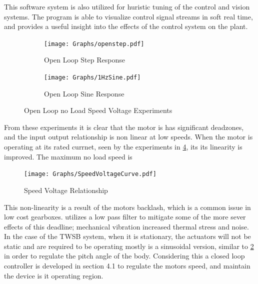         This software system is also utilized for huristic tuning of the control
        and vision systems. The program is able to visualize control signal streams in soft real time, 
        and provides a useful insight into the effects of the control system on the plant.

        \begin{figure}[H]
            \centering
            \begin{subfigure}[b]{0.45\textwidth}
            \texttt{[image: Graphs/openstep.pdf]}
            \caption{Open Loop Step Response}
            \label{fig:openstep}
            \end{subfigure}
            \hfill
            \begin{subfigure}[b]{0.45\textwidth}
            \texttt{[image: Graphs/1HzSine.pdf]}

            \caption{Open Loop Sine Response}
            \label{fig:opensine}
            \end{subfigure}
            \caption{Open Loop no Load Speed Voltage Experiments}
            \label{fig:openloop}
        \end{figure}


        From these experiments it is clear that the motor is has significant deadzones, 
        and the input output relationship is non linear at low speeds. When the motor is operating at its rated currnet, 
        seen by the experiments in \ref{fig:speedvolt}, its its linearity is improved. The maximum no load speed is  
        \begin{figure}[H]
            \centering
            \texttt{[image: Graphs/SpeedVoltageCurve.pdf]}
            \caption{Speed Voltage Relationship}
            \label{fig:speedvolt}
        \end{figure}

        This non-linearity is a result of the motors backlash, which is a common issue in low cost gearboxes.
        \cite{grasser2002joe} utilizes a low pass filter to mitigate some of the more sever effects of 
        this deadline; mechanical vibration increased thermal stress and noise. 
        In the case of the TWSB system, when it is stationary, 
        the actuators will not be static and are required to be operating mostly is a sinusoidal version, 
        similar to \ref{fig:opensine} in order to regulate the pitch angle of the body.
        Considering this a closed loop controller is developed in section 4.1 to regulate the motors speed,
         and maintain the device is it operating region. 
    \pagebreak{}



